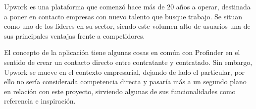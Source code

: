 Upwork\hyperlink{cap:biblio}{}
es una plataforma que comenzó hace más de 20 años a operar, destinada a poner en contacto empresas con nuevo talento que busque trabajo. Se situan como uno de los líderes en su sector, siendo este volumen alto de usuarios una de sus principales ventajas frente a competidores.

El concepto de la aplicación tiene algunas cosas en común con Profinder en el sentido de crear un contacto directo entre contratante y contratado. Sin embargo, Upwork se mueve en el contexto empresarial, dejando de lado el particular, por ello no sería considerada competencia directa y pasaría más a un segundo plano en relación con este proyecto, sirviendo algunas de sus funcionalidades como referencia e inspiración.







